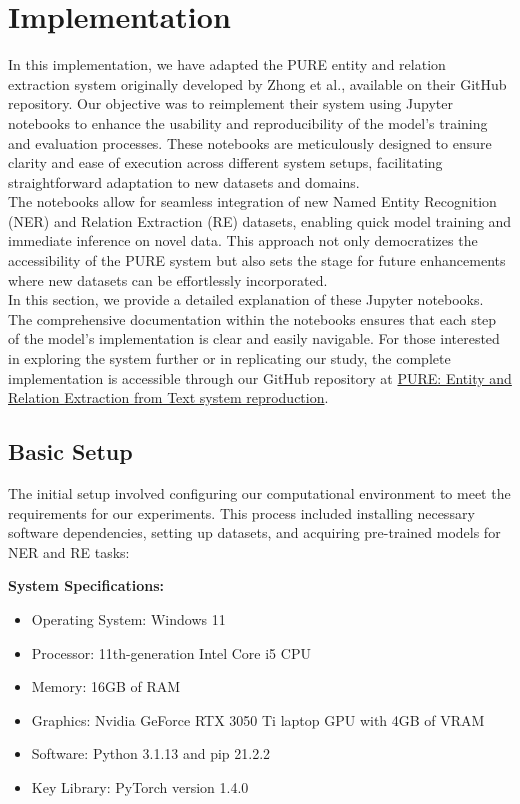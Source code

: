 \section{Implementation}
\label{sec:implementation}
In this implementation, we have adapted the PURE entity and relation extraction system originally developed by Zhong et al.\cite{Zhong2020AFE}, available on their GitHub repository\cite{pure-github-repo}. Our objective was to reimplement their system using Jupyter notebooks to enhance the usability and reproducibility of the model's training and evaluation processes. These notebooks are meticulously designed to ensure clarity and ease of execution across different system setups, facilitating straightforward adaptation to new datasets and domains.\\

The notebooks allow for seamless integration of new Named Entity Recognition (NER) and Relation Extraction (RE) datasets, enabling quick model training and immediate inference on novel data. This approach not only democratizes the accessibility of the PURE system but also sets the stage for future enhancements where new datasets can be effortlessly incorporated.\\

In this section, we provide a detailed explanation of these Jupyter notebooks. The comprehensive documentation within the notebooks ensures that each step of the model's implementation is clear and easily navigable. For those interested in exploring the system further or in replicating our study, the complete implementation is accessible through our GitHub repository at \href{https://github.com/OdaiMohammad/pure-ere-reproduction}{PURE: Entity and Relation Extraction from Text system reproduction}\cite{my-github-repo-code}.\\

\subsection{Basic Setup}
The initial setup involved configuring our computational environment to meet the requirements for our experiments. This process included installing necessary software dependencies, setting up datasets, and acquiring pre-trained models for NER and RE tasks:

\textbf{System Specifications:}

\begin{itemize}
  \item Operating System: Windows 11
  \item Processor: 11th-generation Intel Core i5 CPU
  \item Memory: 16GB of RAM
  \item Graphics: Nvidia GeForce RTX 3050 Ti laptop GPU with 4GB of VRAM
  \item Software: Python 3.1.13 and pip 21.2.2
  \item Key Library: PyTorch version 1.4.0
\end{itemize}

